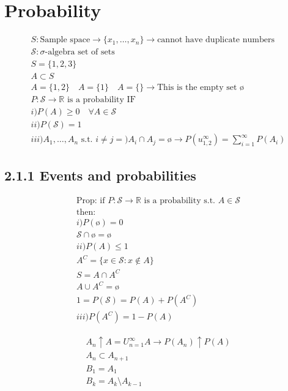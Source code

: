 \documentclass[10pt]{article}
\begin{document}
\newpage

\section{Probability}

\begin{align*}
    S: \text{Sample space} \to \{x_1, …, x_n\} \to \text{cannot have duplicate numbers}\\
    \mathcal{S}: \sigma\text{-algebra }\text{set of sets}\\
    S = \{1, 2, 3\}\\
    A \subset S\\
    A = \{1, 2\} \quad A = \{1\} \quad A = \{\} \to \text{This is the empty set $ø$}\\
    P: \mathcal{S} \to \mathbb{R} \text{ is a probability IF} \\
    i) P(A) \geq 0 \quad\forall A \in \mathcal{S}\\
    ii) P(\mathcal{S}) = 1\\
    iii) A_1, …, A_n \text{ s.t. } i \neq j =) A_i \cap A_j = ø \to P(u_{1, 2}^{\infty}) = \sum_{i = 1}^{\infty}P(A_i)
\end{align*}


\subsection{2.1.1 Events and probabilities}

\begin{align*}
    \text{Prop: if } P : \mathcal{S} \to \mathbb{R} \text{ is a probability} \text{ s.t. } A \in \mathcal{S}\\
    \text{then: }\\
    i) P(ø) = 0\\
    \mathcal{S}\cap ø = ø\\
    ii) P(A) \leq 1\\
    A^C = \{x \in \mathcal{S}: x \notin A\}\\
    S = A \cap A^C\\
    A \cup A^C = ø\\
    1 = P(\mathcal{S}) = P(A) + P(A^C)\\
    iii) P(A^C) = 1 - P(A)
\end{align*}

\begin{align*}
    A_n \uparrow A = U_{n=1}^\infty A \to P(A_n) \uparrow P(A)\\
    A_n \subset A_{n+1}\\
    B_1 = A_1\\
    B_k = A_k \setminus A_{k-1}
\end{align*}
\end{document}
